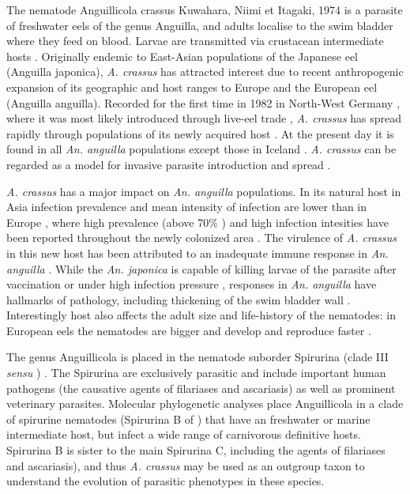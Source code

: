 \documentclass[10pt]{bmc_article}
\newenvironment{bmcformat}{\begin{raggedright}\baselineskip20pt\sloppy\setboolean{publ}{false}}{\end{raggedright}\baselineskip20pt\sloppy}
\begin{document}
\begin{bmcformat}
The nematode Anguillicola crassus Kuwahara, Niimi et Itagaki, 1974
\cite{kuwahara_Niimi_Itagaki_1974} is a parasite of freshwater eels of
the genus Anguilla, and adults localise to the swim bladder where they
feed on blood. Larvae are transmitted via crustacean intermediate
hosts \cite{de_charleroy_life_1990}. Originally endemic to East-Asian
populations of the Japanese eel (Anguilla japonica),
\textit{A. crassus} has attracted interest due to recent anthropogenic
expansion of its geographic and host ranges to Europe and the European
eel (Anguilla anguilla). Recorded for the first time in 1982 in
North-West Germany \cite{fischer_teichwirt}, where it was most likely
introduced through live-eel trade
\cite{koops_anguillicola-infestations_1989, koie_swimbladder_1991},
\textit{A. crassus} has spread rapidly through populations of its
newly acquired host \cite{kirk_impact_2003}. At the present day it is
found in all \textit{An. anguilla} populations except those in Iceland
\cite{kristmundsson_parasite_2007}. \textit{A. crassus} can be
regarded as a model for invasive parasite introduction and spread
\cite{taraschewski_hosts_2007}.

\textit{A. crassus} has a major impact on \textit{An. anguilla}
populations. In its natural host in Asia infection prevalence and mean
intensity of infection are lower than in Europe
\cite{mnderle_occurrence_2006}, where high prevalence (above 70\%
\cite{wrtz_distribution_1998}) and high infection intesities have been
reported throughout the newly colonized area
\cite{lefebvre_anguillicolosis:_2004}. The virulence of
\textit{A. crassus} in this new host has been attributed to an
inadequate immune response in \textit{An. anguilla}
\cite{knopf_swimbladder_2006}. While the \textit{An. japonica} is
capable of killing larvae of the parasite after vaccination
\cite{knopf_vaccination_2008} or under high infection pressure
\cite{heitlinger_massive_2009}, responses in \textit{An. anguilla}
have hallmarks of pathology, including thickening of the swim bladder
wall \cite{wurtz_tara_2000}.  Interestingly host also affects the
adult size and life-history of the nematodes: in European eels the
nematodes are bigger and develop and reproduce faster
\cite{knopf_differences_2004}.

The genus Anguillicola is placed in the nematode suborder Spirurina
(clade III \textit{sensu} \cite{blaxter_molecular_1998})
\cite{nadler_molecular_2007, wijov_evolutionary_2006}. The Spirurina
are exclusively parasitic and include important human pathogens (the
causative agents of filariases and ascariasis) as well as prominent
veterinary parasites. Molecular phylogenetic analyses place
Anguillicola in a clade of spirurine nematodes (Spirurina B of
\cite{dl_py}) that have an freshwater or marine intermediate host, but
infect a wide range of carnivorous definitive hosts. Spirurina B is
sister to the main Spirurina C, including the agents of filariases and
ascariasis), and thus \textit{A. crassus} may be used as an outgroup
taxon to understand the evolution of parasitic phenotypes in these
species.


\end{bmcformat}
\end{document}
